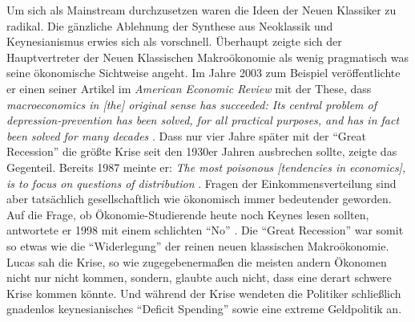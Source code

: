 Um sich als Mainstream durchzusetzen waren die Ideen der Neuen Klassiker zu radikal. Die gänzliche Ablehnung der Synthese aus Neoklassik und Keynesianismus erwies sich als vorschnell. Überhaupt zeigte sich der Hauptvertreter der Neuen Klassischen Makroökonomie als wenig pragmatisch was seine ökonomische Sichtweise angeht. Im Jahre 2003 zum Beispiel veröffentlichte er einen seiner Artikel im \textit{American Economic Review} mit der These, dass \textit{macroeconomics in [the] original sense has succeeded: Its central problem of depression-prevention has been solved, for all practical purposes, and has in fact been solved for many decades} \parencite[S. 1]{Lucas2003}. 
Dass nur vier Jahre später mit der "`Great Recession"' die größte Krise seit den 1930er Jahren ausbrechen sollte, zeigte das Gegenteil. Bereits 1987 meinte er: \textit{The most poisonous [tendencies in economics], is to focus on questions of distribution} \parencite{Lucas1987}. Fragen der Einkommensverteilung sind aber tatsächlich gesellschaftlich wie ökonomisch immer bedeutender geworden. Auf die Frage, ob Ökonomie-Studierende heute noch Keynes lesen sollten, antwortete er 1998 mit einem schlichten "`No"' \parencite{Lucas2013}. Die "`Great Recession"' war somit so etwas wie die "`Widerlegung"' der reinen neuen klassischen Makroökonomie. Lucas sah die Krise, so wie zugegebenermaßen die meisten andern Ökonomen nicht nur nicht kommen, sondern, glaubte auch nicht, dass eine derart schwere Krise kommen könnte. Und während der Krise wendeten die Politiker schließlich gnadenlos keynesianisches "`Deficit Spending"' sowie eine extreme Geldpolitik an. 

